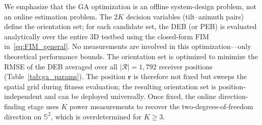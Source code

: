 \documentclass[journal]{IEEEtran}
\newcommand{\added}[1]{{\color{blue}#1}}
\begin{document}
\added{We emphasize that the GA optimization is an offline system-design problem, not an online estimation problem. The $2K$ decision variables (tilt--azimuth pairs) define the orientation set; for each candidate set, the DEB (or PEB) is evaluated analytically over the entire 3D testbed using the closed-form FIM in~\eqref{eq:FIM_general}. No measurements are involved in this optimization---only theoretical performance bounds. The orientation set is optimized to minimize the RMSE of the DEB averaged over all $|\mathcal{R}|=1{,}792$ receiver positions (Table~\ref{tab:ga_params}). The position $\mathbf{r}$ is therefore not fixed but sweeps the spatial grid during fitness evaluation; the resulting orientation set is position-independent and can be deployed universally. Once fixed, the online direction-finding stage uses $K$ power measurements to recover the two-degrees-of-freedom direction on $\mathbb{S}^2$, which is overdetermined for $K\ge3$.}
\end{document}
